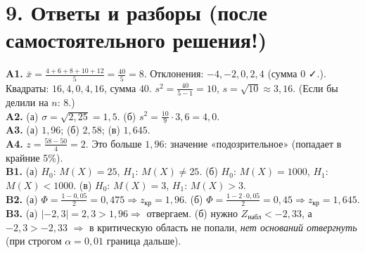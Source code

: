 \documentclass[a4paper,11pt]{extarticle}
\newcommand{\kr}{\text{кр}}\newcommand{\nab}{\text{набл}}
\begin{document}
\newpage
\section*{9. Ответы и разборы (после самостоятельного решения!)}
\small
\textbf{A1.} $\bar x=\frac{4+6+8+10+12}{5}=\frac{40}{5}=8$. Отклонения: $-4,-2,0,2,4$ (сумма 0 ✓.). Квадраты: $16,4,0,4,16$, сумма $40$. $s^2=\frac{40}{5-1}=10$, $s=\sqrt{10}\approx3{,}16$. (Если бы делили на $n$: $8$.)\\
\textbf{A2.} (а) $\sigma=\sqrt{2{,}25}=1{,}5$. (б) $s^2=\frac{10}{9}\cdot3{,}6=4{,}0$.\\
\textbf{A3.} (а) $1{,}96$; (б) $2{,}58$; (в) $1{,}645$.\\
\textbf{A4.} $z=\frac{58-50}{4}=2$. Это больше $1{,}96$: значение «подозрительное» (попадает в крайние 5\%).\\
\textbf{B1.} (а) $H_0$: $M(X)=25$, $H_1$: $M(X)\ne25$. (б) $H_0$: $M(X)=1000$, $H_1$: $M(X)<1000$. (в) $H_0$: $M(X)=3$, $H_1$: $M(X)>3$.\\
\textbf{B2.} (а) $\Phi=\frac{1-0{,}05}{2}=0{,}475\Rightarrow z_\kr=1{,}96$. (б) $\Phi=\frac{1-2\cdot0{,}05}{2}=0{,}45\Rightarrow z_\kr=1{,}645$.\\
\textbf{B3.} (а) $|{-2{,}3}|=2{,}3>1{,}96\Rightarrow$ отвергаем. (б) нужно $Z_\nab<-2{,}33$, а $-2{,}3>-2{,}33$ $\Rightarrow$ в критическую область не попали, \emph{нет оснований отвергнуть} (при строгом $\alpha=0{,}01$ граница дальше).
\end{document}
